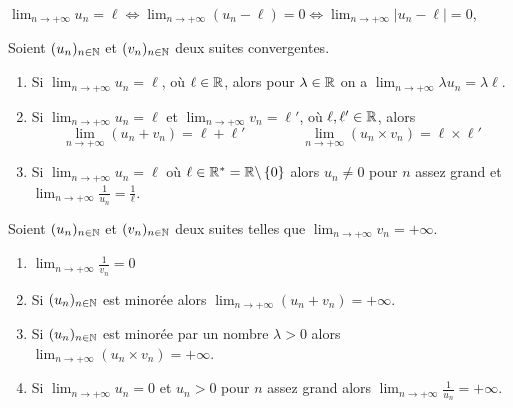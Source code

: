 \documentclass[10pt,class=article,crop=false]{standalone}
\begin{document}
\begin{multicols}{2}
\begin{proposition}
$\lim_{n\to +\infty}u_n=\ell\iff \lim_{n\to +\infty}(u_n-\ell)=0 \iff \lim_{n\to +\infty}\lvert u_n-\ell\rvert =0$,
\end{proposition}


\begin{proposition}
	\label{prop:suitelimite}
	Soient $(u_n)_{n\in \mathbb{N}}$ et $(v_n)_{n\in \mathbb{N}}$ deux suites convergentes.
	\begin{enumerate}
		\item Si $\lim_{n\to +\infty}u_n=\ell$, où $\ell\in \mathbb{R}$, alors pour $\lambda \in \mathbb{R}$ on a $\lim_{n\to +\infty}\lambda u_n=\lambda \ell$.
		\item Si $\lim_{n\to +\infty}u_n=\ell$ et $\lim_{n\to +\infty}v_n=\ell'$, où $\ell,\ell'\in \mathbb{R}$, alors
		$$
			\lim_{n\to +\infty}\left(u_n+v_n\right)=\ell+\ell' \qquad\qquad
			\lim_{n\to +\infty}\left(u_n\times v_n\right)=\ell\times \ell'
		$$
		\item Si $\lim_{n\to +\infty}u_n=\ell$ où $\ell\in \mathbb{R}^*= \mathbb{R}\backslash \left\{0\right\}$
		alors $u_n\neq 0 $ pour $n$ assez grand et $\lim_{n\to +\infty}\frac{1}{u_n}=\frac{1}{\ell}$.
	\end{enumerate}
\end{proposition}




\begin{proposition}
	\label{prop:suiteinfty}
	Soient $(u_n)_{n\in \mathbb{N}}$ et $(v_n)_{n\in \mathbb{N}}$ deux suites telles que $\lim_{n\to +\infty}v_n=+\infty$.
	\begin{enumerate}
		\item  $\lim_{n\to +\infty}\frac{1}{v_n}=0$
		\item Si $(u_n)_{n\in \mathbb{N}}$ est minorée alors  $\lim_{n\to +\infty}\left(u_n+v_n\right)=+\infty$.
		\item Si $(u_n)_{n\in \mathbb{N}}$ est minorée par un nombre $\lambda>0$
		alors $\lim_{n\to +\infty}\left(u_n\times v_n\right)=+\infty$.
		\item Si $\lim_{n\to +\infty}u_n= 0$ et $u_n>0$ pour $n$ assez
		grand alors $\lim_{n\to +\infty}\frac{1}{u_n}=+\infty$.
	\end{enumerate}
\end{proposition}






\end{multicols}
\end{document}

